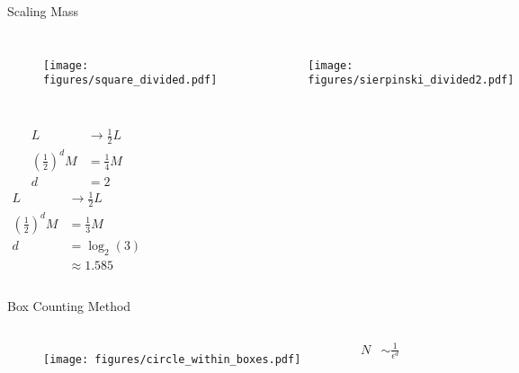 \documentclass[10pt]{beamer}
\begin{document}
\begin{frame}{Scaling Mass}
    \begin{columns}[c]
        \column{1.5in}
        \begin{figure}[h!]
            \centering
            \texttt{[image: figures/square\_divided.pdf]}
        \end{figure}
    \column{1.5in}
        \begin{figure}[h!]
            \centering
            \texttt{[image: figures/sierpinski\_divided2.pdf]}
        \end{figure}
    \end{columns}
    \begin{columns}[c]
        \column{1.5in}
            \begin{align*}
                L &\rightarrow \frac{1}{2} L \\
                \left (\frac{1}{2} \right )^d M &= \frac{1}{4} M \\
                d &= 2
            \end{align*}
        \column{1.5in}
            \begin{align*}
                L &\rightarrow \frac{1}{2} L \\
                \left (\frac{1}{2} \right )^d M &= \frac{1}{3} M \\
                d &= \log_2 (3) \\ &\approx 1.585
            \end{align*}
    \end{columns}
\end{frame}

\begin{frame}{Box Counting Method}
    \begin{columns}[c]
        \column{1.5in}
        \begin{figure}[h!]
            \centering
            \texttt{[image: figures/circle\_within\_boxes.pdf]}
        \end{figure}
        \column{1.5in}
            \begin{align*}
                N &\sim \frac{1}{\epsilon^d} \\
            \end{align*}
    \end{columns}
\end{frame}
\end{document}
